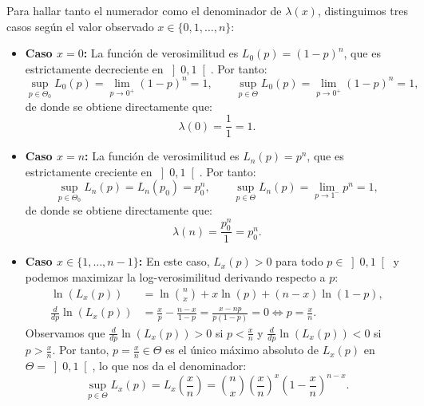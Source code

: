 \begin{ejercicio}
    Para hallar tanto el numerador como el denominador de $\lambda(x)$, distinguimos tres casos según el valor observado $x \in \{0, 1, \ldots, n\}$:
    \begin{itemize}
        \item \textbf{Caso $x = 0$:}
        La función de verosimilitud es $L_0(p) = (1 - p)^n$, que es estrictamente decreciente en $\left]0, 1\right[$. Por tanto:
        \begin{equation*}
            \sup\limits_{p \in \Theta_0} L_0(p) = \lim_{p \to 0^+} (1 - p)^n = 1, \qquad \sup\limits_{p \in \Theta} L_0(p) = \lim_{p \to 0^+} (1 - p)^n = 1,
        \end{equation*}
        de donde se obtiene directamente que:
        \begin{equation*}
            \lambda(0) = \frac{1}{1} = 1.
        \end{equation*}

        \item \textbf{Caso $x = n$:}
        La función de verosimilitud es $L_n(p) = p^n$, que es estrictamente creciente en $\left]0, 1\right[$. Por tanto:
        \begin{equation*}
            \sup\limits_{p \in \Theta_0} L_n(p) = L_n(p_0) = p_0^n, \qquad \sup\limits_{p \in \Theta} L_n(p) = \lim_{p \to 1^-} p^n = 1,
        \end{equation*}
        de donde se obtiene directamente que:
        \begin{equation*}
            \lambda(n) = \frac{p_0^n}{1} = p_0^n.
        \end{equation*}

        \item \textbf{Caso $x \in \{1, \ldots, n - 1\}$:}
        En este caso, $L_x(p) > 0$ para todo $p \in \left]0, 1\right[$ y podemos maximizar la log-verosimilitud derivando respecto a $p$:
        \begin{align*}
            \ln\left(L_x(p)\right) &= \ln\binom{n}{x} + x\ln(p) + (n - x)\ln(1 - p), \\
            \frac{d}{dp} \ln\left(L_x(p)\right) &= \frac{x}{p} - \frac{n - x}{1 - p} = \frac{x - np}{p(1 - p)} = 0 \Longleftrightarrow p = \frac{x}{n}.
        \end{align*}
        Observamos que $\frac{d}{dp} \ln(L_x(p)) > 0$ si $p < \frac{x}{n}$ y $\frac{d}{dp} \ln(L_x(p)) < 0$ si $p > \frac{x}{n}$. Por tanto, $p = \frac{x}{n} \in \Theta$ es el único máximo absoluto de $L_x(p)$ en $\Theta = \left]0, 1\right[$, lo que nos da el denominador:
        \begin{equation*}
            \sup\limits_{p \in \Theta} L_x(p) = L_x\left(\frac{x}{n}\right) = \binom{n}{x} \left(\frac{x}{n}\right)^x \left(1 - \frac{x}{n}\right)^{n - x}.
        \end{equation*}


\end{itemize}
\end{ejercicio}
